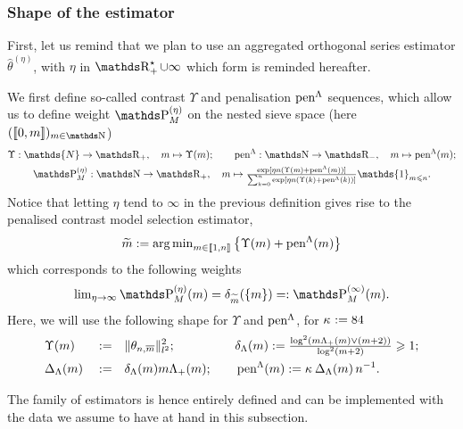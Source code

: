 \subsubsection{Shape of the estimator}
First, let us remind that we plan to use an aggregated orthogonal series estimator $\widehat{\theta}^{(\eta)}$, with $\eta$ in $\R_{+}^{\star} \cup \infty$ which form is reminded hereafter.
\begin{de*}
We first define so-called contrast $\Upsilon$ and penalisation $\operatorname{pen}^{\Lambda}$ sequences, which allow us to define weight $\P_{M}^{(\eta)}$ on the nested sieve space (here $(\llbracket 0, m \rrbracket)_{m \in \N}$)
\begin{multline*}
\Upsilon : \mathds{N} \to \R_{+}, \quad m \mapsto \Upsilon(m); \qquad \pen^{\Lambda} : \N \to \R_{-}, \quad m \mapsto \pen^{\Lambda}(m);\\
\P_{M}^{(\eta)} : \N \to \R_{+}, \quad m \mapsto \tfrac{\exp[\eta n (\Upsilon(m) + \pen^{\Lambda}(m))]}{\sum\nolimits_{k = 0}^{n} \exp[\eta n (\Upsilon(k) + \pen^{\Lambda}(k))]} \mathds{1}_{m \leq n}.
\end{multline*}
Notice that letting $\eta$ tend to $\infty$ in the previous definition gives rise to the penalised contrast model selection estimator,
\begin{equation*}
  \widetilde{m}:=\operatorname*{arg\,min}\nolimits_{m\in{\llbracket 1,n\rrbracket }} \big\{\Upsilon(m) + \operatorname{pen}^{\Lambda}(m)\big\}
\end{equation*}
which corresponds to the following weights
\begin{equation*}
  \lim\nolimits_{\rWc\to\infty}\rWe=\dirac[\tDi](\{\Di\})=:\msWe.
\end{equation*}
Here, we will use the following shape for $\Upsilon$ and $\operatorname{pen}^{\Lambda}$, for $\kappa_{} := 84$
\begin{alignat*}{4}
  & \Upsilon(m) && := && \Vert \theta_{n, \overline{m}} \Vert_{l^{2}}^{2};  \quad && \delta_{\Lambda}(m) := \tfrac{\log^{2}(m\Lambda_{+}(m) \vee(m+2))}{\log^{2}(m+2)}\geqslant1;\\
  & \Delta_{\Lambda}(m) && := && \delta_{\Lambda}(m) m \Lambda_{+}(m); \quad && \operatorname{pen}^{\Lambda}(m):= \kappa_{}\,\Delta_{\Lambda}(m)\,n^{-1}.
  \end{alignat*}
  \assEnd
\end{de*}
The family of estimators is hence entirely defined and can be implemented with the data we assume to have at hand in this subsection.
  
